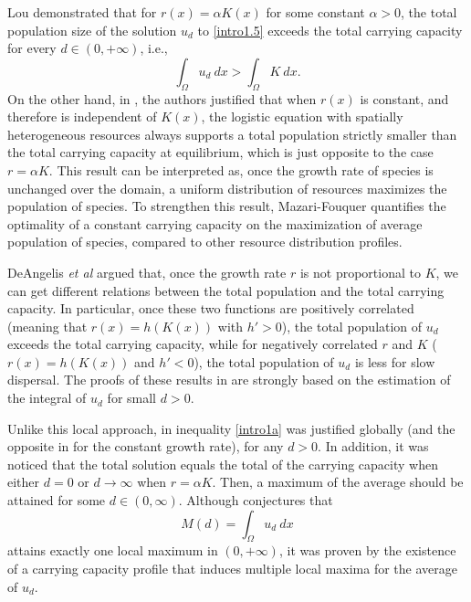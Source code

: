 \documentclass[11pt]{article}
\theoremstyle{definition}
\theoremstyle{remark}
\begin{document}
Lou \cite{Lou} demonstrated that for 
$r(x) = \alpha K(x)$ for some constant $\alpha>0$, the total population size of the solution $u_d$ to \eqref{intro1.5} exceeds the total carrying capacity for every $d\in(0,+\infty)$, i.e.,
\begin{equation}\label{intro1a}
\int_{\Omega} u_d~ dx > \int_{\Omega} K~dx.
\end{equation}
On the other hand, in \cite{Guo_2020}, the authors justified that when $r(x)$ is constant, and therefore is independent of $K (x)$,  the logistic equation with spatially heterogeneous resources always supports a total population strictly smaller than the total
carrying capacity at equilibrium, which is just opposite to the case $r = \alpha K$. This result can be interpreted as, once the growth rate of species is unchanged over the domain, a uniform distribution of resources maximizes the population of species. To strengthen this result, Mazari-Fouquer \cite{MazariFouquer2024} quantifies the optimality of a constant carrying capacity on the maximization of average population of species, compared to other resource distribution profiles.

DeAngelis {\em et al} \cite{Ang2016} argued that, once the growth rate $r$ is not proportional to $K$, we can get different relations between the total population and the total carrying capacity. In particular, once these two functions are positively correlated (meaning that $r(x) = h(K(x))$ with $h'>0$), the total population of $u_d$ exceeds the total carrying capacity, while
for negatively correlated $r$ and $K$ ($r(x) = h(K(x))$ and $h'<0$), the total population of $u_d$  is less for slow dispersal. The  proofs of these results in \cite{Ang2016}  are strongly based on the estimation 
of the integral of $u_d$ for small $d>0$. 

Unlike this local approach, in \cite{Lou} inequality \eqref{intro1a} was justified globally (and the opposite in \cite{Guo_2020} for the constant growth rate), for any $d>0$.
In addition, it was noticed that the total solution equals the total of the carrying capacity when either $d=0$ or $d \to \infty$ when $r = \alpha K$. 
Then, a maximum of the average should be attained for some $d \in (0,\infty)$.
Although \cite{Lou} conjectures that
\begin{equation}
\label{def:integral}
M(d) = \int_{\Omega} u_d~ dx
\end{equation}
attains exactly one local maximum in $(0,+\infty)$, it was proven by \cite{Liang2012} the existence of a carrying capacity profile that induces multiple local maxima for the average of $u_d$.
\end{document}
